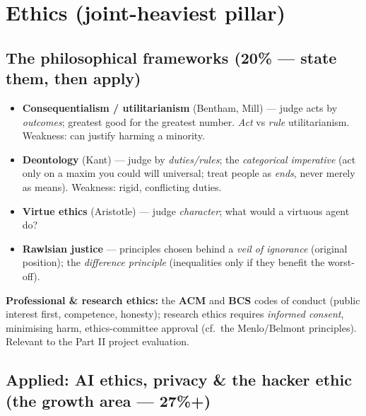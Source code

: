\documentclass[11pt,a4paper]{article}
\begin{document}
\section{Ethics (joint-heaviest pillar)}

\subsection{The philosophical frameworks (20\% --- state them, then apply)}

\begin{must}
\begin{itemize}[leftmargin=*,itemsep=1pt]
  \item \textbf{Consequentialism / utilitarianism} (Bentham, Mill) --- judge acts by \emph{outcomes}; greatest good for the greatest number. \emph{Act} vs \emph{rule} utilitarianism. Weakness: can justify harming a minority.
  \item \textbf{Deontology} (Kant) --- judge by \emph{duties/rules}; the \emph{categorical imperative} (act only on a maxim you could will universal; treat people as \emph{ends}, never merely as means). Weakness: rigid, conflicting duties.
  \item \textbf{Virtue ethics} (Aristotle) --- judge \emph{character}; what would a virtuous agent do?
  \item \textbf{Rawlsian justice} --- principles chosen behind a \emph{veil of ignorance} (original position); the \emph{difference principle} (inequalities only if they benefit the worst-off).
\end{itemize}
\end{must}

\begin{useful}
\textbf{Professional \& research ethics:} the \textbf{ACM} and \textbf{BCS} codes of conduct (public interest first, competence, honesty); research ethics requires \emph{informed consent}, minimising harm, ethics-committee approval (cf.\ the Menlo/Belmont principles). Relevant to the Part II project evaluation.
\end{useful}

\subsection{Applied: AI ethics, privacy \& the hacker ethic (the growth area --- 27\%+)}
\end{document}
